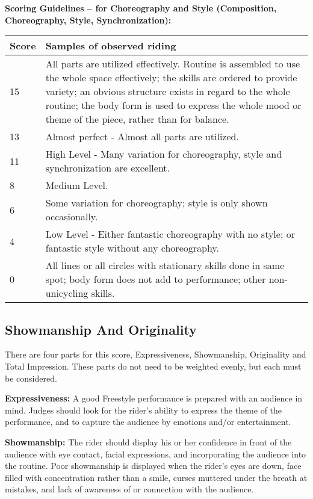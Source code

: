 \begin{minipage}{\textwidth}
\textbf{Scoring Guidelines – for Choreography and Style (Composition, Choreography, Style, Synchronization):} \\

\begin{tabular}{|l|p{12.5cm}|}
\hline
\textbf{Score} & \textbf{Samples of observed riding} \\
\hline
15 & All parts are utilized effectively. Routine is assembled to use the whole space effectively; the skills are ordered to provide variety; an obvious structure exists in regard to the whole routine; the body form is used to express the whole mood or theme of the piece, rather than for balance.  \\
\hline
13 & Almost perfect - Almost all parts are utilized. \\
\hline
11 & High Level - Many variation for choreography, style and synchronization are excellent. \\
\hline
8 & Medium Level. \\
\hline
6 & Some variation for choreography; style is only shown occasionally. \\
\hline
4 & Low Level - Either fantastic choreography with no style; or fantastic style without any choreography. \\
\hline
0 & All lines or all circles with stationary skills done in same spot; body form does not add to performance; other non-unicycling skills. \\
\hline
\end{tabular}
\end{minipage}

\subsection{Showmanship And Originality}
There are four parts for this score, Expressiveness, Showmanship, Originality and Total Impression.
These parts do not need to be weighted evenly, but each must be considered.

\textbf{Expressiveness:} A good Freestyle performance is prepared with an audience in mind.
Judges should look for the rider's ability to express the theme of the performance, and to capture the audience by emotions and/or entertainment.

\textbf{Showmanship:} The rider should display his or her confidence in front of the audience with eye contact, facial expressions, and incorporating the audience into the routine.
Poor showmanship is displayed when the rider's eyes are down, face filled with concentration rather than a smile, curses muttered under the breath at mistakes, and lack of awareness of or connection with the audience.

